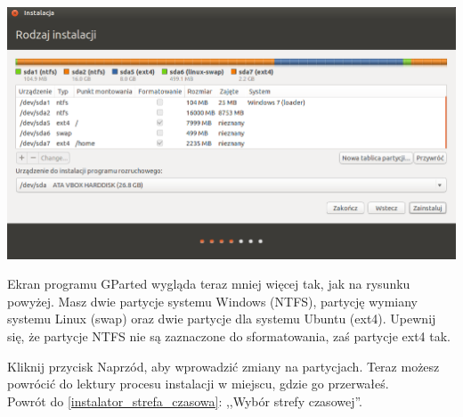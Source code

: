 \begin{center}
        \includegraphics[width=\linewidth]{images/instalator_partycjonowanie_gparted4.png}
\end{center}
Ekran programu GParted wygląda teraz mniej więcej tak, jak na rysunku powyżej. Masz dwie partycje systemu Windows (NTFS), partycję wymiany systemu Linux (swap) oraz dwie partycje dla systemu Ubuntu (ext4). Upewnij się, że partycje NTFS \textcolor{ubuntu_orange}{nie} są zaznaczone do sformatowania, zaś partycje ext4 tak.

Kliknij przycisk \textcolor{ubuntu_orange}{Naprzód}, aby wprowadzić zmiany na partycjach. Teraz możesz powrócić do lektury procesu instalacji w miejscu, gdzie go przerwałeś.\\
Powrót do \ref{instalator_strefa_czasowa}: ,,Wybór strefy czasowej''.